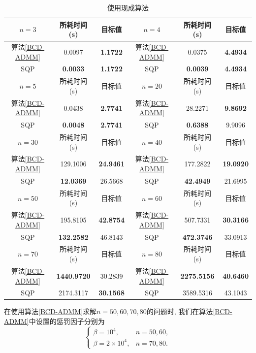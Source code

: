 \documentclass[UTF8,10.5pt,a4paper]{ctexart}
\theoremstyle{definition}
\theoremstyle{definition}
\begin{document}
\begin{table}[htbp]
	\renewcommand{\captionfont}{\small}
	\centering
	\caption{\small 使用现成算法}
	\label{already exist}
	\vskip 4mm
	\begin{tabular}{c|c|c||c|c|c}
		\hline
		$n=3$ & 所耗时间 (s) & 目标值 & $n=4$ & 所耗时间 (s) & 目标值\\\hline
		算法\ref{BCD-ADMM} & 0.0097 & \textbf{1.1722} & 算法\ref{BCD-ADMM} & 0.0375 & \textbf{4.4934}\\\hline
		SQP & \textbf{0.0033} & \textbf{1.1722} & SQP & \textbf{0.0039} & \textbf{4.4934}\\\hline
		\hline
		$n=5$ & 所耗时间 (s) & 目标值 & $n=20$ & 所耗时间 (s) & 目标值\\\hline
		算法\ref{BCD-ADMM} & 0.0438 & \textbf{2.7741} & 算法\ref{BCD-ADMM} & 28.2271 & \textbf{9.8692}\\\hline
		SQP & \textbf{0.0048} & \textbf{2.7741} & SQP & \textbf{0.6388} & 9.9096\\\hline
		\hline
		$n=30$ & 所耗时间 (s) & 目标值 & $n=40$ & 所耗时间 (s) & 目标值\\\hline
		算法\ref{BCD-ADMM} & 129.1006 & \textbf{24.9461} & 算法\ref{BCD-ADMM} & 177.2822 & \textbf{19.0920}\\\hline
		SQP & \textbf{12.0369} & 26.5668 & SQP & \textbf{42.4949} & 21.6995\\\hline
		\hline
		$n=50$ & 所耗时间 (s) & 目标值 & $n=60$ & 所耗时间 (s) & 目标值\\\hline
		算法\ref{BCD-ADMM} & 195.8105 & \textbf{42.8754} & 算法\ref{BCD-ADMM} & 507.7331 & \textbf{30.3166}\\\hline
		SQP & \textbf{132.2582} & 46.8143 & SQP & \textbf{472.3746} & 33.0913\\\hline
		\hline
		$n=70$ & 所耗时间 (s) & 目标值 & $n=80$ & 所耗时间 (s) & 目标值\\\hline
		算法\ref{BCD-ADMM} & \textbf{1440.9720} & 30.2839 & 算法\ref{BCD-ADMM} & \textbf{2275.5156} & \textbf{40.6460} \\\hline
		SQP & 2174.3117 & \textbf{30.1568} & SQP & 3589.5316 & 43.1043\\\hline
		
	\end{tabular}
\end{table}
在使用算法\ref{BCD-ADMM}求解$n=50,60,70,80$的问题时, 我们在算法\ref{BCD-ADMM}中设置的惩罚因子分别为
$$\left\{\begin{array}{ll}
	\beta=10^4, & n=50,60,\\
	\beta=2\times10^4, & n=70,80.
\end{array}\right.$$
\end{document}
